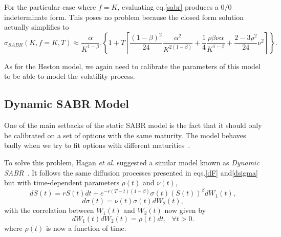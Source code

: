 For the particular case where $f=K$, evaluating eq.\eqref{sabr} produces a $0/0$ indeterminate form. This poses no problem because the closed form solution actually simplifies to~\citep{Hagan}
\begin{equation}
\sigma_{SABR}(K,f=K,T)\approx\frac{\alpha}{K^{1-\beta}}.\left\{1+T\left[\frac{(1-\beta)^2}{24}\frac{\alpha^2}{K^{2(1-\beta)}}+\frac{1}{4}\frac{\rho\beta\nu\alpha}{K^{1-\beta}}+\frac{2-3\rho^2}{24}\nu^2\right]\right\}.
\end{equation}

As for the Heston model, we again need to calibrate the parameters of this model to be able to model the volatility process.


\subsection{Dynamic SABR Model}
One of the main setbacks of the static SABR model is the fact that it should only be calibrated on a set of options with the same maturity. The model behaves badly when we try to fit options with different maturities~\citep{Hagan}. 

To solve this problem, Hagan \textit{et al.} suggested a similar model known as \emph{Dynamic SABR}~\citep{Hagan}. It follows the same diffusion processes presented in eqs.\eqref{dF} and\eqref{dsigma} but with time-dependent parameters $\rho(t)$ and $\nu(t)$,
\begin{equation}\label{dF2}
\boxed{dS(t)=rS(t)dt+e^{-r(T-t)(1-\beta)}\sigma(t) (S(t))^\beta dW_1(t),}
\end{equation}
\begin{equation}\label{dsigma2}
\boxed{d\sigma(t)=\nu(t)\sigma(t) dW_2(t),}
\end{equation}
\noindent with the correlation between $W_1(t)$ and $W_2(t)$ now given by
\begin{equation}
dW_1(t)dW_2(t)=\rho(t) dt, \ \ \ \forall t>0.
\end{equation}
\noindent where $\rho(t)$ is now a function of time.



